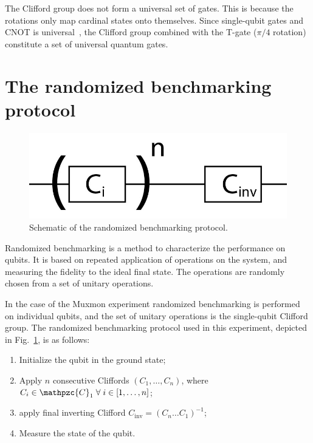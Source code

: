       The Clifford group does not form a universal set of gates. This is because the rotations only map cardinal states onto themselves. Since single-qubit gates and CNOT is universal~\cite{nielsen2010quantum}, the Clifford group combined with the T-gate ($\pi/4$ rotation) constitute a set of universal quantum gates.

    \section{The randomized benchmarking protocol}
      \label{sec:randomized benchmarking protocol}

      \begin{figure}
        \begin{center}
        \vspace{-30pt}
          \includegraphics[width=.8\textwidth]{Figures/Randomized benchmarking/RB schematic.jpg}
        \end{center}
        \vspace{-20 pt}
        \caption{Schematic of the randomized benchmarking protocol.}
        \label{fig:RB schematic}
      \end{figure}

      Randomized benchmarking is a method to characterize the performance on qubits. It is based on repeated application of operations on the system, and measuring the fidelity to the ideal final state. The operations are randomly chosen from a set of unitary operations.

      In the case of the Muxmon experiment randomized benchmarking is performed on individual qubits, and the set of unitary operations is the single-qubit Clifford group. The randomized benchmarking protocol used in this experiment, depicted in Fig.~\ref{fig:RB schematic}, is as follows:

      \begin{enumerate}
        \item Initialize the qubit in the ground state;
        \item Apply $n$ consecutive Cliffords $\left(C_1, \dots, C_n\right)$, where $C_i \in \mathpzc{C}_1 \; \forall \; i \in \left[1, \dots, n\right]$;
        \item apply final inverting Clifford $C_\text{inv}=\left( C_n \dots C_1 \right)^{-1}$;
        \item Measure the state of the qubit.
      \end{enumerate}

